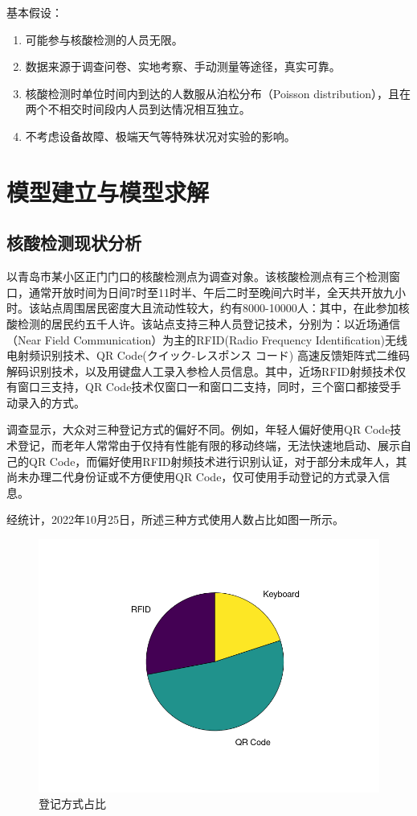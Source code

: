 \documentclass[
  journal=,
  manuscript=,
  year=2022,
  volume=01,
]{cup-journal}
\begin{document}
\par 基本假设：

\begin{enumerate}
	\item 可能参与核酸检测的人员无限。
	\item 数据来源于调查问卷、实地考察、手动测量等途径，真实可靠。
	\item 核酸检测时单位时间内到达的人数服从泊松分布（Poisson distribution），且在两个不相交时间段内人员到达情况相互独立。
	\item 不考虑设备故障、极端天气等特殊状况对实验的影响。
\end{enumerate}

\section{模型建立与模型求解}

\subsection{核酸检测现状分析}

\par 以青岛市某小区正门门口的核酸检测点为调查对象。该核酸检测点有三个检测窗口，通常开放时间为日间7时至11时半、午后二时至晚间六时半，全天共开放九小时。该站点周围居民密度大且流动性较大，约有8000-10000人：其中，在此参加核酸检测的居民约五千人许。该站点支持三种人员登记技术，分别为：以近场通信（Near Field Communication）为主的RFID(Radio Frequency Identification)无线电射频识别技术、QR Code(クイック-レスポンス コード) 高速反馈矩阵式二维码解码识别技术，以及用键盘人工录入参检人员信息。其中，近场RFID射频技术仅有窗口三支持，QR Code技术仅窗口一和窗口二支持，同时，三个窗口都接受手动录入的方式。
\par 调查显示，大众对三种登记方式的偏好不同。例如，年轻人偏好使用QR Code技术登记，而老年人常常由于仅持有性能有限的移动终端，无法快速地启动、展示自己的QR Code，而偏好使用RFID射频技术进行识别认证，对于部分未成年人，其尚未办理二代身份证或不方便使用QR Code，仅可使用手动登记的方式录入信息。
\par 经统计，2022年10月25日，所述三种方式使用人数占比如图一所示。

\begin{figure}[hbt!]
	\centering
	\includegraphics[width=0.75\linewidth]{fig/r.png}
	\caption{登记方式占比}
	\label{fig_rec}
\end{figure}
\end{document}
